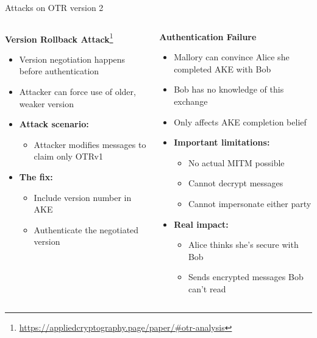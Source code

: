 \documentclass[aspectratio=169, lualatex, handout]{beamer}
\begin{document}
\begin{frame}{Attacks on OTR version 2}
	\begin{columns}
		\begin{column}{0.5\textwidth}
			\textbf{Version Rollback Attack}\footnote{\url{https://appliedcryptography.page/paper/\#otr-analysis}}
			\begin{itemize}
				\item Version negotiation happens before authentication
				\item Attacker can force use of older, weaker version
				\item \textbf{Attack scenario:}
				      \begin{itemize}
					      \item Attacker modifies messages to claim only OTRv1
				      \end{itemize}
				\item \textbf{The fix:}
				      \begin{itemize}
					      \item Include version number in AKE
					      \item Authenticate the negotiated version
				      \end{itemize}
			\end{itemize}
		\end{column}
		\begin{column}{0.5\textwidth}
			\textbf{Authentication Failure}
			\begin{itemize}
				\item Mallory can convince Alice she completed AKE with Bob
				\item Bob has no knowledge of this exchange
				\item Only affects AKE completion belief
				\item \textbf{Important limitations:}
				      \begin{itemize}
					      \item No actual MITM possible
					      \item Cannot decrypt messages
					      \item Cannot impersonate either party
				      \end{itemize}
				\item \textbf{Real impact:}
				      \begin{itemize}
					      \item Alice thinks she's secure with Bob
					      \item Sends encrypted messages Bob can't read
				      \end{itemize}
			\end{itemize}
		\end{column}
	\end{columns}
\end{frame}
\end{document}
